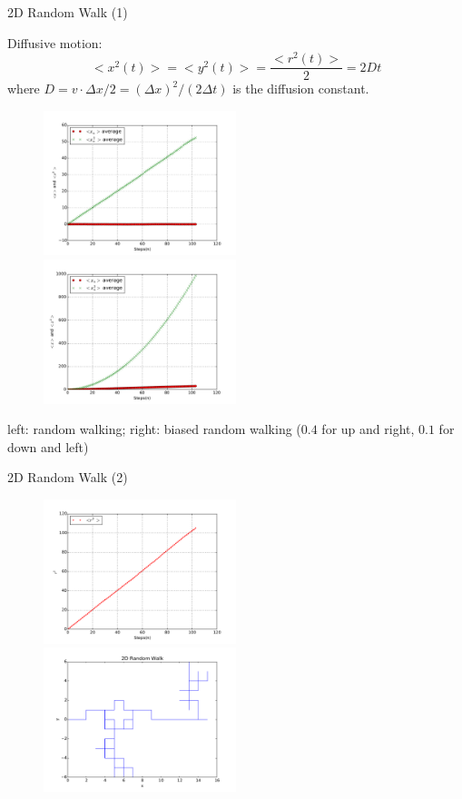\documentclass{beamer}
\begin{document}
\begin{frame}{2D Random Walk (1)}

Diffusive motion:
\begin{equation}
	<x^2(t)> = <y^2(t)> = \frac{<r^2(t)>}{2}= 2Dt
\end{equation}	
where $D = v\cdot\Delta x/2 = (\Delta x)^2/(2\Delta t)$ is the diffusion constant.	
\begin{figure}[H]
	\centering
	\includegraphics[width=0.5\textwidth]{rwxn.pdf}
	\includegraphics[width=0.5\textwidth]{rwxn_2.pdf}
\end{figure}	
left: random walking; right: biased random walking ($0.4$ for up and right, $0.1$ for down and left)
\end{frame}

\begin{frame}{2D Random Walk (2)}

\begin{figure}[H]
	\centering
	\includegraphics[width=0.5\textwidth]{rwxn2.pdf}
  	\includegraphics[width=0.5\textwidth]{rwxn3.pdf}
\end{figure}
	

\end{frame}
\end{document}
